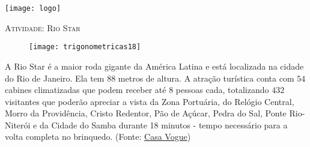 \documentclass[10 pt,usenames,dvipsnames, oneside]{article}
\begin{document}
\begin{center}
  \begin{minipage}[l]{3cm}
\texttt{[image: logo]}    
\end{minipage}\hfill
\begin{minipage}[r]{.8\textwidth}
 {\Large \scshape Atividade: Rio Star}  
\end{minipage}
\end{center}
\vspace{.2cm}






\begin{figure}[H]
\centering

\texttt{[image: trigonometricas18]}
\end{figure}

A Rio Star é a maior roda gigante da América Latina e está localizada na cidade do Rio de Janeiro. Ela tem $88$ metros de altura. A atração turística conta com $54$ cabines climatizadas que podem receber até 8 pessoas cada, totalizando $432$ visitantes que poderão apreciar a vista da Zona Portuária, do Relógio Central, Morro da Providência, Cristo Redentor, Pão de Açúcar, Pedra do Sal, Ponte Rio-Niterói e da Cidade do Samba durante 18 minutos - tempo necessário para a volta completa no brinquedo. (Fonte: \href{https://casavogue.globo.com/LazerCultura/Viagem/noticia/2019/12/rio-star-roda-gigante-do-rio-de-janeiro-inaugura-hoje.html}{Casa Vogue})
\end{document}
